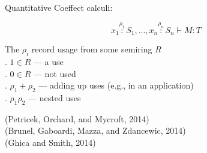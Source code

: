 \documentclass[xetex,serif,mathserif,aspectratio=169]{beamer}
\begin{document}



\begin{frame}
  Quantitative Coeffect calculi:

  \begin{displaymath}
    x_1 \stackrel{\rho_1}: S_1, \dots, x_n \stackrel{\rho_n}: S_n \vdash M : T
  \end{displaymath}

  \pause
  \bigskip

  \point The $\rho_i$ record usage from some semiring $R$ \\
  \quad . $1 \in R$ --- a use \\
  \quad . $0 \in R$ --- not used \\
  \quad . $\rho_1 + \rho_2$ --- adding up uses (e.g., in an application) \\
  \quad . $\rho_1\rho_2$ --- nested uses

  \pause
  \bigskip

  {\footnotesize
    \textcolor{black!60}{(Petricek, Orchard, and Mycroft, 2014)} \\
    \textcolor{black!60}{(Brunel, Gaboardi, Mazza, and Zdancewic, 2014)} \\
    \textcolor{black!60}{(Ghica and Smith, 2014)} \\
  }
\end{frame}
\end{document}
